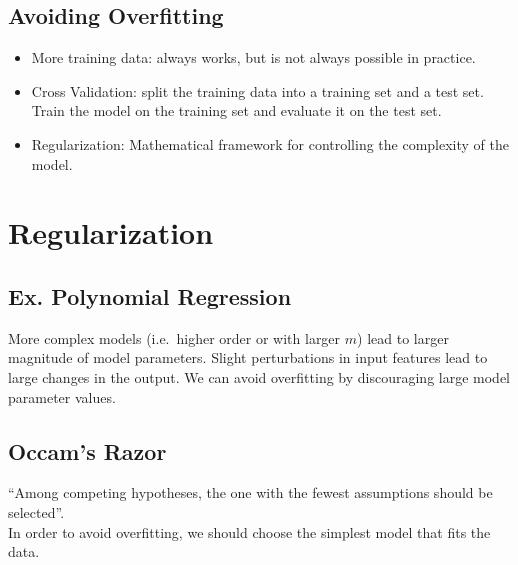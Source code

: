 \documentclass[12pt]{article}
\begin{document}
        \subsection{Avoiding Overfitting}
            \begin{itemize}
                \item More training data: always works, but is not always possible in practice.
                \item Cross Validation: split the training data into a training set and a test set. Train the model on the training set and evaluate it on the test set.
                \item Regularization: Mathematical framework for controlling the complexity of the model.
            \end{itemize}
    \section{Regularization}
        \subsection{Ex. Polynomial Regression}
            More complex models (i.e.\ higher order or with larger $m$) lead to larger magnitude of model parameters.
            Slight perturbations in input features lead to large changes in the output.
            We can avoid overfitting by discouraging large model parameter values.
        \subsection{Occam's Razor}
            ``Among competing hypotheses, the one with the fewest assumptions should be selected''. \\
            In order to avoid overfitting, we should choose the simplest model that fits the data.
\end{document}
